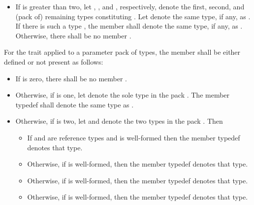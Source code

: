 \begin{itemize}
\item If  is greater than two,
let , , and , respectively,
denote the first, second, and (pack of) remaining types constituting .
Let  denote the same type, if any, as .
If there is such a type , the member  
shall denote the same type, if any, as .
Otherwise, there shall be no member .
\end{itemize}


\begin{addedblock}
\pnum
For the  trait applied to a parameter pack  of
types, the member  shall be either defined or not present as follows:
\begin{itemize}
\item If  is zero, there shall be no member .

\item Otherwise, if  is one, let  denote the sole
  type in the pack . The member typedef  shall denote the
  same type as .

\item Otherwise, if  is two, let  and 
  denote the two types in the pack . Then
  \begin{itemize}
  \item If  and  are reference types and
     is well-formed 
    then the member typedef  denotes that type.

  \item Otherwise, if  is well-formed, then the member typedef
     denotes that type.

  \item Otherwise, if  is well-formed, then the
    member typedef  denotes that type.

  \item Otherwise, if  is well-formed, then the
    member typedef  denotes that type.


\end{itemize}
\end{itemize}
\end{addedblock}
